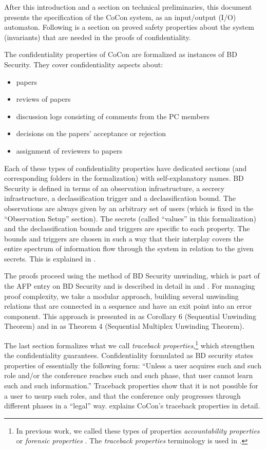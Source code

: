 \documentclass[11pt,a4paper]{article}
\begin{document}
After this introduction and a section on technical preliminaries, this document presents the specification of the CoCon system, as an input/output (I/O) automaton.
Following is a section on proved safety properties about the system (invariants) that are needed in the proofs of confidentiality.

The confidentiality properties of CoCon are formalized as instances of BD Security.
They cover confidentiality aspects about:
\begin{itemize}
	\item papers
	\item reviews of papers
	\item discussion logs consisting of comments from the PC members
	\item decisions on the papers' acceptance or rejection
	\item assignment of reviewers to papers
\end{itemize}
%
Each of these types of confidentiality properties have dedicated sections (and corresponding folders in the formalization) with self-explanatory names.  BD Security is defined in terms of an observation infrastructure, a secrecy infrastructure,  a declassification trigger and a declassification bound. The observations are always given by an arbitrary set of users (which is fixed in the ``Observation Setup'' section).  The secrets (called ``values'' in this formalization) and the declassification bounds and triggers are specific to each property.
The bounds and triggers are chosen in such a way that their interplay covers the entire spectrum of information flow through the system in relation to the given secrets. This is explained in \cite[Section 3.5]{cocon-JAR2021}.

The proofs proceed using the method of BD Security unwinding, which
is part of the AFP entry on BD Security \cite{BDSecurity-AFP} and
is described in detail in \cite[Sections 4.1 and 4.2]{cocon-JAR2021} and \cite[Sections 2.5 and 2.6]{BDsecurity-ITP2021}.  For managing proof complexity, we take a modular approach, building several
unwinding relations that are connected in a sequence and have an exit point into an error component. This approach is presented in \cite{cocon-JAR2021} as Corollary 6 (Sequential Unwinding Theorem)
and in \cite{BDsecurity-ITP2021} as Theorem 4 (Sequential Multiplex Unwinding Theorem).

The last section formalizes what we call \emph{traceback properties},\footnote{In previous work, we called
	these types of properties  \emph{accountability properties}  \cite{cosmed-itp2016,cosmed-jar2018} or \emph{forensic properties} \cite{cocon-CAV2014}.
	The  \emph{traceback properties} terminology is used in \cite{cocon-JAR2021}.}
which  strengthen the confidentiality guarantees. Confidentiality formulated as BD security states properties of essentially the following form: ``Unless a user acquires such and such role and/or the conference reaches such and such phase, that user cannot learn such and such information.''
Traceback properties show that it is not possible for a user to usurp such roles, and that the conference only progresses through different phases in a ``legal'' way. \cite[Section 3.6]{cocon-JAR2021} explains CoCon's traceback properties in detail.
\end{document}

